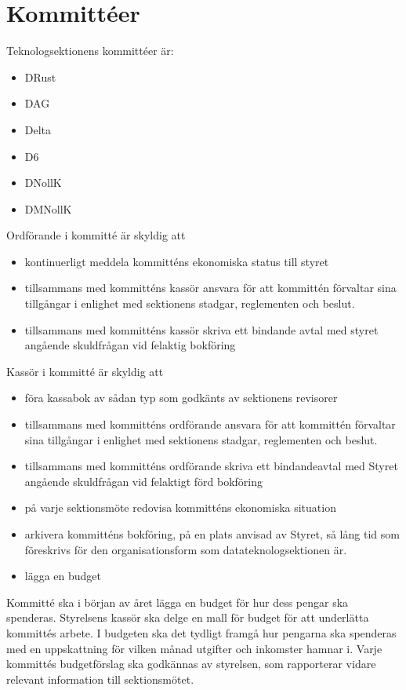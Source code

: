 \documentclass[a4paper]{dtek}
\begin{document}
\section{Kommittéer}
\para Teknologsektionens kommittéer är:
\begin{itemize}
  \item DRust
  \item DAG
  \item Delta
  \item D6
  \item DNollK
  \item DMNollK
\end{itemize}
\para Ordförande i kommitté är skyldig att
\begin{itemize}
  \item kontinuerligt meddela kommitténs ekonomiska status till styret
  \item tillsammans med kommitténs kassör ansvara för att kommittén förvaltar sina tillgångar i enlighet med sektionens stadgar, reglementen och beslut.
  \item tillsammans med kommitténs kassör skriva ett bindande avtal med styret angående skuldfrågan vid felaktig bokföring
\end{itemize}
\para Kassör i kommitté är skyldig att
\begin{itemize}
  \item föra kassabok av sådan typ som godkänts av sektionens revisorer
  \item tillsammans med kommitténs ordförande ansvara för att kommittén förvaltar sina tillgångar i enlighet med sektionens stadgar, reglementen och beslut.
  \item tillsammans med kommitténs ordförande skriva ett bindandeavtal med Styret angående skuldfrågan vid felaktigt förd bokföring
  \item på varje sektionsmöte redovisa kommitténs ekonomiska situation
  \item arkivera kommitténs bokföring, på en plats anvisad av Styret, så lång tid som föreskrivs för den organisationsform som datateknologsektionen är.
  \item lägga en budget
\end{itemize}
\para Kommitté ska i början av året lägga en budget för hur dess pengar ska spenderas.
\stycke Styrelsens kassör ska delge en mall för budget för att underlätta kommittés arbete.
\stycke I budgeten ska det tydligt framgå hur pengarna ska spenderas med en uppskattning för vilken månad utgifter och inkomster hamnar i.
\para Varje kommittés budgetförslag ska godkännas av styrelsen, som rapporterar vidare relevant information till sektionsmötet.
\end{document}
